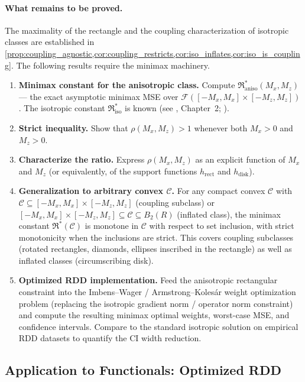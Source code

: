 \paragraph{What remains to be proved.}
The maximality of the rectangle and the coupling characterization of isotropic classes are established in \cref{prop:coupling_agnostic,cor:coupling_restricts,cor:iso_inflates,cor:iso_is_coupling}.
The following results require the minimax machinery.
\begin{enumerate}
	\item \textbf{Minimax constant for the anisotropic class.} Compute $\mathfrak{R}^*_{\mathrm{aniso}}(M_x, M_z)$ --- the exact asymptotic minimax MSE over $\mathcal{F}([-M_x, M_x] \times [-M_z, M_z])$.
	The isotropic constant $\mathfrak{R}^*_{\mathrm{iso}}$ is known (see \textcite{tsybakov_introduction_2009}, Chapter~2; \textcite{donoho_statistical_1994}).
	\item \textbf{Strict inequality.} Show that $\rho(M_x, M_z) > 1$ whenever both $M_x > 0$ and $M_z > 0$.
	\item \textbf{Characterize the ratio.} Express $\rho(M_x, M_z)$ as an explicit function of $M_x$ and $M_z$ (or equivalently, of the support functions $h_{\mathrm{rect}}$ and $h_{\mathrm{disk}}$).
	\item \textbf{Generalization to arbitrary convex $\mathcal{C}$.} For any compact convex $\mathcal{C}$ with $\mathcal{C} \subseteq [-M_x, M_x] \times [-M_z, M_z]$ (coupling subclass) or $[-M_x, M_x] \times [-M_z, M_z] \subseteq \mathcal{C} \subseteq B_2(R)$ (inflated class), the minimax constant $\mathfrak{R}^*(\mathcal{C})$ is monotone in $\mathcal{C}$ with respect to set inclusion, with strict monotonicity when the inclusions are strict.
	This covers coupling subclasses (rotated rectangles, diamonds, ellipses inscribed in the rectangle) as well as inflated classes (circumscribing disk).
	\item \textbf{Optimized RDD implementation.} Feed the anisotropic rectangular constraint into the Imbens--Wager / Armstrong--Kolesár weight optimization problem (replacing the isotropic gradient norm / operator norm constraint) and compute the resulting minimax optimal weights, worst-case MSE, and confidence intervals.
	Compare to the standard isotropic solution on empirical RDD datasets to quantify the CI width reduction.
\end{enumerate}


\subsection{Application to Functionals: Optimized RDD}\label{sec:overview:functionals}

